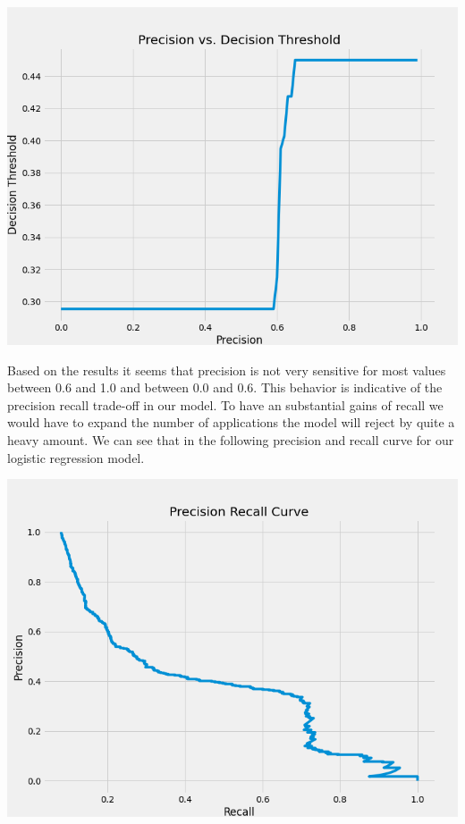 \documentclass[12pt]{article}
\begin{document}
	\begin{center}
		\includegraphics[scale = 0.4]{../notebooks/precisionvsthreshold.png}
	\end{center}
	
	Based on the results it seems that precision is not very sensitive for most values between 0.6 and 1.0 and between 0.0 and 0.6. This behavior is indicative of the precision recall trade-off in our model. To have an substantial gains of recall we would have to expand the number of applications the model will reject by quite a heavy amount. We can see that in the following precision and recall curve for our logistic regression model. 
	
	\begin{center}
		\includegraphics[scale=0.4]{../notebooks/pr_curve_lr.png}
	\end{center}
\end{document}
